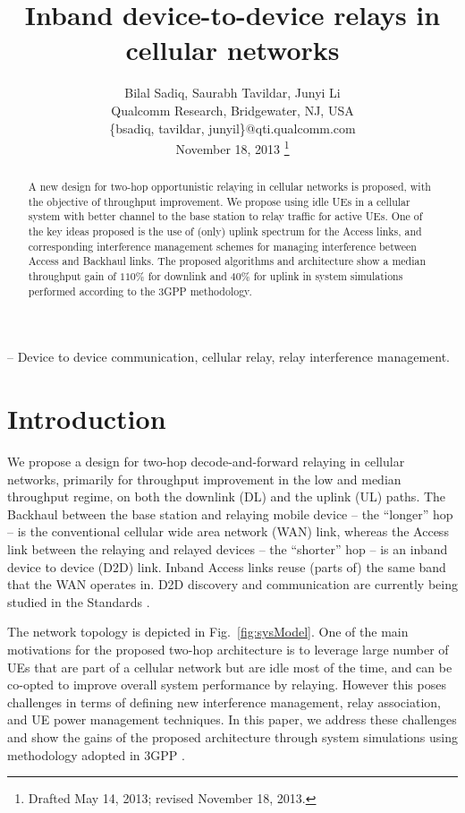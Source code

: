 \documentclass[journal]{IEEEtran}
\begin{document}
\title{Inband device-to-device relays in cellular networks}

\author{Bilal Sadiq, Saurabh Tavildar, Junyi Li\\
        Qualcomm Research, Bridgewater, NJ, USA\\
        \{bsadiq, tavildar, junyil\}@qti.qualcomm.com\\
        \vspace{0.15in}
        November 18, 2013
\thanks{Drafted May 14, 2013; revised November 18, 2013.}}
\maketitle

\begin{abstract}
	A new design for two-hop opportunistic relaying in cellular networks is proposed, with the objective of throughput improvement. We propose using idle UEs in a cellular system with better channel to the base station to relay traffic for active UEs. One of the key ideas proposed is the use of (only) uplink spectrum for the Access links, and corresponding interference management schemes for managing interference between Access and Backhaul links. The proposed algorithms and architecture show a median throughput gain of $110\%$ for downlink and $40\%$ for uplink in system simulations performed according to the 3GPP methodology.
\end{abstract}

 -- Device to device communication, cellular relay, relay interference management.

\section{Introduction}
\label{sec:intro}
We propose a design for two-hop decode-and-forward relaying in cellular networks, primarily for throughput improvement in the low and median throughput regime, on both the downlink (DL) and the uplink (UL) paths.   The Backhaul between the base station and relaying mobile device -- the ``longer'' hop -- is the conventional cellular wide area network (WAN) link, whereas the Access link between the relaying and relayed devices -- the ``shorter'' hop -- is an inband device to device (D2D) link. Inband Access links reuse (parts of) the same band that the WAN operates in. D2D discovery and communication are currently being studied in the Standards \cite{3GPP22803}.

The network topology is depicted in Fig.~\ref{fig:sysModel}.  One of the main motivations for the proposed two-hop architecture is to leverage large number of UEs that are part of a cellular network but are idle most of the time, and can be co-opted to improve overall system performance by relaying. However this poses challenges in terms of defining new interference management, relay association, and UE power management techniques.  In this paper, we address these challenges and show the gains of the proposed architecture through system simulations using methodology adopted in 3GPP \cite{3GPP36814}.
\end{document}
